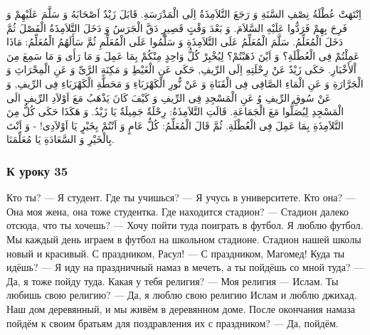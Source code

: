 \documentclass[a5paper]{article}
\begin{document}
اِنْتَهَتْ عُطْلَةُ نِصْفِ السَّنَةِ وَ رَجَعَ التَّلاَمِذَةُ اِلَى الْمَدْرَسَةِ. قَابَلَ زَيْدٌ اَصْحَابَهُ وَ سَلَّمَ عَلَيْهِمْ وَ فَرِحَ بِهِمْ فَرَدُّوا عَلَيْهِ السَّلاَمَ. وَ بَعْدَ وَقْتٍ قَصِيرٍ دَقَّ الْجَرَسُ وَ دَخَلَ التَّلاَمِذَةُ الْفَصْلَ ثُمَّ دَخَلَ الْمُعَلِّمُ. سَلَّمَ الْمُعَلِّمُ عَلَى التَّلاَمِذَةِ وَ سَلَّمُوا عَلَى الْمُعَلِّمِ ثُمَّ سَأَلَهُمُ الْمُعَلِّمُ: مَاذَا عَمِلْتُمْ فِى الْعُطْلَةِ؟ وَ اَيْنَ ذَهَبْتُمْ؟ لِيُخْبِرْ كُلُّ وَاحِدٍ مِنْكُمْ بِمَا عَمِلَ وَ مَا رَأَى وَ مَا سَمِعَ مِنَ اْلأَخْبَارِ. حَكَى زَيْدٌ عَنْ رِحْلَتِهِ اِلَى الرِّيفِ, حَكَى عَنِ الْغَيْطِ وَ مَكِنَةِ الرَّىِّ وَ عَنِ الْمِحْرَاثِ وَ الْجَرَّارَةِ وَ عَنِ الْمَاءِ الصَّافِى فِى الْقَنَاةِ وَ عَنْ نُّورِ الْكَهْرَبَاءِ وَ مَحَطَّةِ الْكَهْرَبَاءِ فِى الرِّيفِ, وَ عَنْ سُوقِ الرِّيفِ وُ عَنِ الْمَسْجِدِ فِى الرِّيفِ وَ كَيْفَ كَانَ يَذْهَبُ مَعَ اَوْلاَدِ الرِّيفِ الَى الْمَسْجِدِ لِيُصَلُّوا مَعَ الْجَمَاعَةِ. قَالَتِ التَّلاَمِذَةُ: رِحْلَةٌ جَمِيلَةٌ يَا زَيْدُ. وَ هَكَذَا حَكَى كُلٌّ مِنَ التَّلاَمِذَةِ بِمَا عَمِلَ فِى الْعُطْلَةِ. ثُمَّ قَالَ الْمُعَلِّمُ: كُلُّ عَامٍ وَ اَنْتُمْ بِخَيْرٍ يَا اَوْلاَدِى! - وَ اَنْتَ بِالْخَيْرِ وَ السَّعَادَةِ يَا مُعَلِّمَنَا.

\subsubsection{К уроку 35}
Кто ты? — Я студент. Где ты учишься? — Я учусь в университете. Кто она? — Она моя жена, она тоже студентка. Где находится ста­дион? — Стадион далеко отсюда, что ты хочешь? — Хочу пойти туда поиграть в футбол. Я люблю футбол. Мы каждый день играем в футбол на школьном стадионе. Стадион нашей школы новый и красивый. С праздником, Расул! — С праздником, Магомед! Куда ты идёшь? — Я иду на праздничный намаз в мечеть, а ты пойдёшь со мной туда? — Да, я тоже пойду туда. Какая у тебя религия? — Моя религия — Ислам. Ты любишь свою религию? — Да, я люблю свою религию Ислам и люблю джихад. Наш дом деревянный, и мы живём в деревянном доме. После окончания намаза пойдём к своим братьям для поздравления их с праздником? — Да, пойдём.
\end{document}
